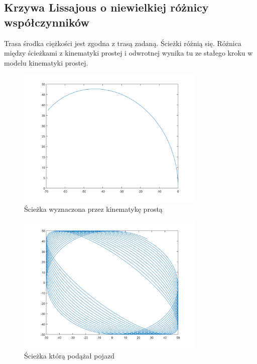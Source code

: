 \documentclass[a4paper, 12pt]{report}
\begin{document}
			\subsection{Krzywa Lissajous o niewielkiej różnicy współczynników}
				Trasa środka ciężkości jest zgodna z trasą zadaną. Ścieżki różnią się. Różnica między ścieżkami z kinematyki prostej i odwrotnej wynika tu ze stałego kroku w modelu kinematyki prostej.
				\begin{figure}[H]
					\centering
					\includegraphics[width = 0.8\textwidth]{./AP/img/rev/lissajous_1_in_1.png}
					\caption{Ścieżka wyznaczona przez kinematykę prostą}
				\end{figure}
				\begin{figure}[H]
					\centering
					\includegraphics[width = 0.8\textwidth]{./AP/img/rev/lissajous_1_in_2.png}
					\caption{Ścieżka którą podążał pojazd}
				\end{figure}
\end{document}
